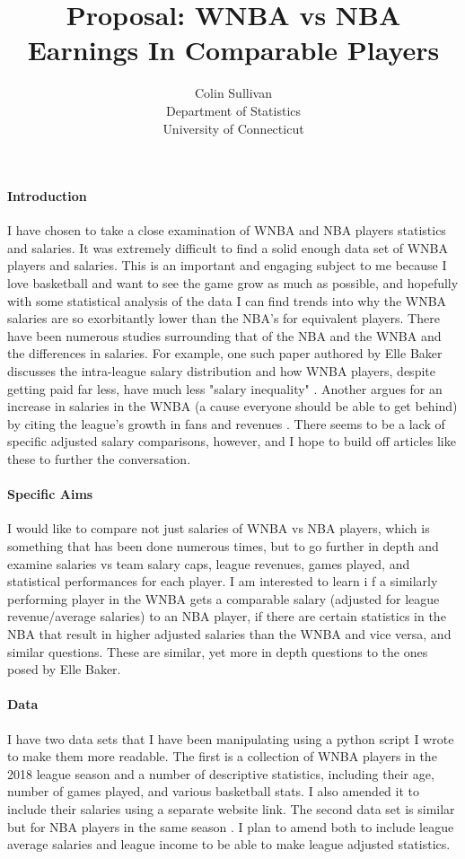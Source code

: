 \documentclass[12pt]{article}
\title{Proposal: WNBA vs NBA Earnings In Comparable Players}
\author{Colin Sullivan\\
  Department of Statistics\\
  University of Connecticut
}
\begin{document}
\maketitle


\paragraph{Introduction}
I have chosen to take a close examination of WNBA and NBA players statistics and salaries. It was 
extremely difficult to find a solid enough data set of WNBA players and salaries. This is an important 
and engaging subject to me because I love basketball and want to see the game grow as much as possible, 
and hopefully with some statistical analysis of the data I can find trends into why the WNBA salaries 
are so exorbitantly lower than the NBA's for equivalent players.
\newline
There have been numerous studies surrounding that of the NBA and the WNBA and the differences in salaries.
For example, one such paper authored by Elle Baker discusses the intra-league salary distribution and
how WNBA players, despite getting paid far less, have much less "salary inequality"
\cite{baker2020comparison}. Another argues for an increase in salaries in the WNBA (a cause everyone
should be able to get behind) by citing the league's growth in fans and revenues \cite{ettienne2019s}.
There seems to be a lack of specific adjusted salary comparisons, however, and I hope to build off articles
like these to further the conversation.

\paragraph{Specific Aims}
I would like to compare not just salaries of WNBA vs NBA players, which is something that has been 
done numerous times, but to go further in depth and examine salaries vs team salary caps, league 
revenues, games played, and statistical performances for each player. I am interested to learn i
f a similarly performing player in the WNBA gets a comparable salary (adjusted for league revenue/average
salaries) to an NBA player, if there are certain statistics in the NBA that result in higher adjusted 
salaries than the WNBA and vice versa, and similar questions.
These are similar, yet more in depth questions to the ones posed by Elle Baker.

\paragraph{Data}
I have two data sets that I have been manipulating using a python script I wrote to make them more 
readable. The first is a collection of WNBA players \cite{first} in the 2018 league season and a number of 
descriptive statistics, including their age, number of games played, and various basketball 
stats. I also amended it to include their salaries using a separate website link. The second data 
set is similar but for NBA players in the same season \cite{nba}. I plan to amend both to include league average 
salaries and league income to be able to make league adjusted statistics.
\end{document}
